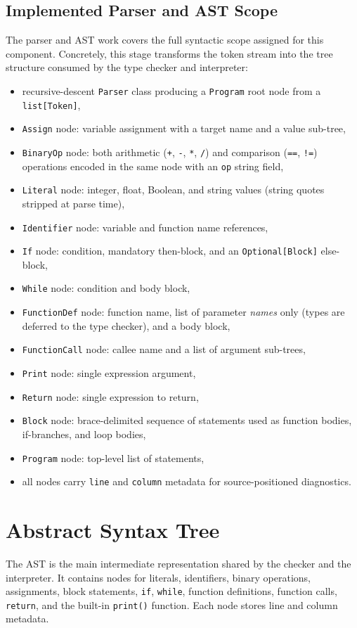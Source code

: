 \subsection{Implemented Parser and AST Scope}
The parser and AST work covers the full syntactic scope assigned for this
component. Concretely, this stage transforms the token stream into the tree
structure consumed by the type checker and interpreter:

\begin{itemize}
    \item recursive-descent \texttt{Parser} class producing a \texttt{Program} root node from a \texttt{list[Token]},
    \item \texttt{Assign} node: variable assignment with a target name and a value sub-tree,
    \item \texttt{BinaryOp} node: both arithmetic (\texttt{+}, \texttt{-}, \texttt{*}, \texttt{/}) and comparison (\texttt{==}, \texttt{!=}) operations encoded in the same node with an \texttt{op} string field,
    \item \texttt{Literal} node: integer, float, Boolean, and string values (string quotes stripped at parse time),
    \item \texttt{Identifier} node: variable and function name references,
    \item \texttt{If} node: condition, mandatory then-block, and an \texttt{Optional[Block]} else-block,
    \item \texttt{While} node: condition and body block,
    \item \texttt{FunctionDef} node: function name, list of parameter \emph{names} only (types are deferred to the type checker), and a body block,
    \item \texttt{FunctionCall} node: callee name and a list of argument sub-trees,
    \item \texttt{Print} node: single expression argument,
    \item \texttt{Return} node: single expression to return,
    \item \texttt{Block} node: brace-delimited sequence of statements used as function bodies, if-branches, and loop bodies,
    \item \texttt{Program} node: top-level list of statements,
    \item all nodes carry \texttt{line} and \texttt{column} metadata for source-positioned diagnostics.
\end{itemize}

\section{Abstract Syntax Tree}
The AST is the main intermediate representation shared by the checker and the
interpreter. It contains nodes for literals, identifiers, binary operations,
assignments, block statements, \texttt{if}, \texttt{while}, function
definitions, function calls, \texttt{return}, and the built-in
\texttt{print()} function. Each node stores line and column metadata.

